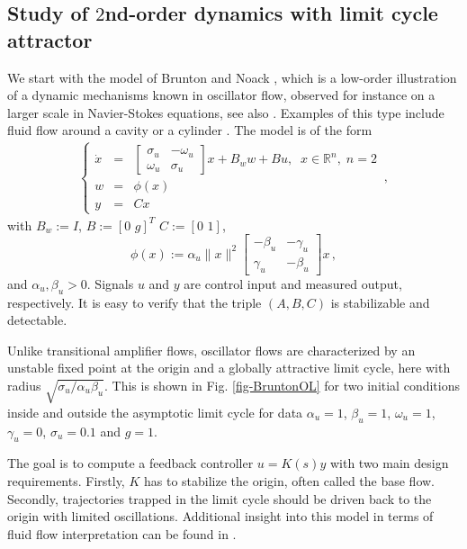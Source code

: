 \documentclass[12pt, a4paper,reqno]{amsart}
\theoremstyle{definition}
\begin{document}
\subsection{Study of $2$nd-order dynamics with limit cycle  attractor\label{sect-brunton}}
We start with
the model of Brunton and Noack \cite{brunton2015closed}, which is a low-order illustration of a dynamic mechanisms 
known in oscillator flow, 
observed for instance on a larger scale in Navier-Stokes equations, see also \cite{Taira2017AIAA_Overview}.
Examples of this type include fluid flow around a cavity or a cylinder \cite{leclercq2019linear,illingworth_morgans_rowley_2012}. 
The model is of the form 
%
\begin{eqnarray}
\label{eq-Brunton1}
\left\{ \begin{array}{lll} \dot x &=& \begin{bmatrix}\sigma_u & -\omega_ u\\\omega_ u & \sigma_u 
\end{bmatrix} x  + B_w w + B u, \;\; x \in \mathbb R^n,\;  n = 2\\
w & = & \phi(x)  \\ 
y & = & C x  \end{array}\right. \,,
\end{eqnarray}
with $B_w := I$, $B:= [0 \,\, g]^T$ $C:=[0 \,\, 1]$, 
$$
\phi(x):=  \alpha_u \| x \|^2 \begin{bmatrix}-\beta_u & -\gamma_ u\\\gamma_ u & -\beta_u  
\end{bmatrix} x \,,
$$
and  $\alpha_u, \beta_u > 0$. 
Signals $u$ and $y$ are control input and measured output, respectively. It is easy to verify that the triple $(A,B,C)$ is stabilizable and detectable. 

Unlike  transitional amplifier  flows, oscillator flows are 
characterized by an unstable fixed point at the origin and a globally attractive limit cycle,
here with radius $\sqrt{\sigma_u/\alpha_u \beta_u }$. This is shown in Fig. \ref{fig-BruntonOL}  
for two initial conditions inside and outside the asymptotic limit cycle for data $\alpha_u=1$, $\beta_u=1$, $\omega_u=1$, $\gamma_u=0$,  $\sigma_u=0.1$ and $g=1$. 

The goal is to compute a feedback controller $u = K(s) y$ with two main design requirements. 
Firstly, $K$ has to stabilize the origin, often called the base flow. 
Secondly, trajectories trapped in the limit cycle should be driven back to the origin with limited oscillations.  
Additional insight into this model in terms of fluid flow interpretation can be found in \cite{brunton2015closed}. 
\end{document}
